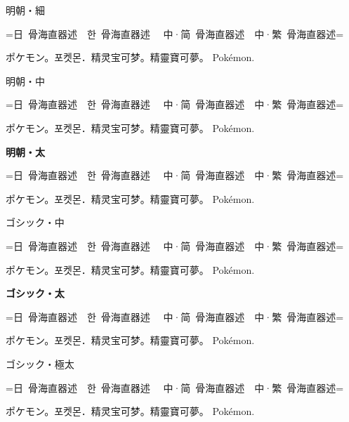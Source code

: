 \documentclass[dvipdfmx]{ujarticle}
\begin{document}
\parindent0mm

{\mcfamily
  {\ltseries
    明朝・細\par
    =日~骨海直器述~~\foreignlanguage{korean}{한~骨海直器述}%
    ~~\foreignlanguage{schinese}{中·简~骨海直器述}~~\foreignlanguage{tchinese}{中·繁~骨海直器述}=\par
    ポケモン。\foreignlanguage{korean}{포켓몬．}\foreignlanguage{schinese}{精灵宝可梦。}\foreignlanguage{tchinese}{精靈寶可夢。} Pokémon.
    \par}
  {\mdseries
    明朝・中\par
    =日~骨海直器述~~\foreignlanguage{korean}{한~骨海直器述}%
    ~~\foreignlanguage{schinese}{中·简~骨海直器述}~~\foreignlanguage{tchinese}{中·繁~骨海直器述}=\par
    ポケモン。\foreignlanguage{korean}{포켓몬．}\foreignlanguage{schinese}{精灵宝可梦。}\foreignlanguage{tchinese}{精靈寶可夢。} Pokémon.
    \par}
  {\bfseries
    明朝・太\par
    =日~骨海直器述~~\foreignlanguage{korean}{한~骨海直器述}%
    ~~\foreignlanguage{schinese}{中·简~骨海直器述}~~\foreignlanguage{tchinese}{中·繁~骨海直器述}=\par
    ポケモン。\foreignlanguage{korean}{포켓몬．}\foreignlanguage{schinese}{精灵宝可梦。}\foreignlanguage{tchinese}{精靈寶可夢。} Pokémon.
    \par}}

{\gtfamily
  {\mdseries
    ゴシック・中\par
    =日~骨海直器述~~\foreignlanguage{korean}{한~骨海直器述}%
    ~~\foreignlanguage{schinese}{中·简~骨海直器述}~~\foreignlanguage{tchinese}{中·繁~骨海直器述}=\par
    ポケモン。\foreignlanguage{korean}{포켓몬．}\foreignlanguage{schinese}{精灵宝可梦。}\foreignlanguage{tchinese}{精靈寶可夢。} Pokémon.
    \par}
  {\bfseries
    ゴシック・太\par
    =日~骨海直器述~~\foreignlanguage{korean}{한~骨海直器述}%
    ~~\foreignlanguage{schinese}{中·简~骨海直器述}~~\foreignlanguage{tchinese}{中·繁~骨海直器述}=\par
    ポケモン。\foreignlanguage{korean}{포켓몬．}\foreignlanguage{schinese}{精灵宝可梦。}\foreignlanguage{tchinese}{精靈寶可夢。} Pokémon.
    \par}
  {\ebseries
    ゴシック・極太\par
    =日~骨海直器述~~\foreignlanguage{korean}{한~骨海直器述}%
    ~~\foreignlanguage{schinese}{中·简~骨海直器述}~~\foreignlanguage{tchinese}{中·繁~骨海直器述}=\par
    ポケモン。\foreignlanguage{korean}{포켓몬．}\foreignlanguage{schinese}{精灵宝可梦。}\foreignlanguage{tchinese}{精靈寶可夢。} Pokémon.
    \par}}
\end{document}
